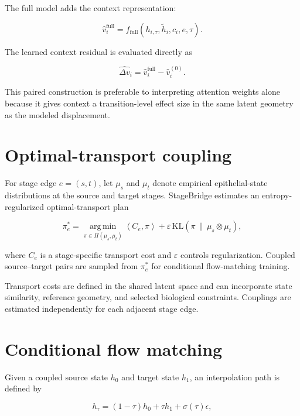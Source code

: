 The full model adds the context representation:

\begin{equation}
\hat{v}_{i}^{\mathrm{full}}
=
f_{\mathrm{full}}
\left(h_{i,\tau},\tilde{h}_i,c_i,e,\tau\right).
\end{equation}

The learned context residual is evaluated directly as

\begin{equation}
\widehat{\Delta v}_i
=
\hat{v}_{i}^{\mathrm{full}}
-
\hat{v}_{i}^{(0)}.
\end{equation}

This paired construction is preferable to interpreting attention weights alone because it gives context a transition-level effect size in the same latent geometry as the modeled displacement.

\section{Optimal-transport coupling}

For stage edge $e=(s,t)$, let $\mu_s$ and $\mu_t$ denote empirical epithelial-state distributions at the source and target stages. StageBridge estimates an entropy-regularized optimal-transport plan

\begin{equation}
\pi_e^{*}
=
\operatorname*{arg\,min}_{\pi\in\Pi(\mu_s,\mu_t)}
\left\langle C_e,\pi\right\rangle
+
\varepsilon\,\mathrm{KL}
\left(
\pi\,\|\,\mu_s\otimes\mu_t
\right),
\label{eq:ot}
\end{equation}

where $C_e$ is a stage-specific transport cost and $\varepsilon$ controls regularization. Coupled source--target pairs are sampled from $\pi_e^{*}$ for conditional flow-matching training.

Transport costs are defined in the shared latent space and can incorporate state similarity, reference geometry, and selected biological constraints. Couplings are estimated independently for each adjacent stage edge.

\section{Conditional flow matching}

Given a coupled source state $h_0$ and target state $h_1$, an interpolation path is defined by

\begin{equation}
h_{\tau}
=
(1-\tau)h_0+\tau h_1+\sigma(\tau)\epsilon,
\end{equation}

